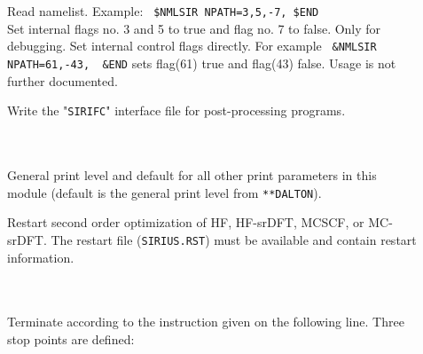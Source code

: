 \begin{description}

\item[] \ \\
   \\
  Read namelist. Example: \verb" $NMLSIR NPATH=3,5,-7, $END" \\
  Set internal flags no. 3 and 5 to true and flag no. 7 to false.
  Only for debugging. Set internal control flags directly.
  For example  \verb" &NMLSIR NPATH=61,-43,  &END" sets flag(61) true and flag(43) false.
  Usage is not further documented.

\item[]
  Write the "\verb|SIRIFC|" interface file for post-processing programs.


\item[] \ \\
   \\
  General {\sir} print level and default for all other print parameters in this module
  (default is the general print level from \verb|**DALTON|).

\item[]
  Restart {\sir} second order optimization of HF, HF-srDFT, MCSCF, or MC-srDFT.
  The {\sir} restart file (\verb|SIRIUS.RST|) must be available and contain restart information.


\item[] \ \\
   \\
  Terminate {\sir} according to the instruction given on the following line.
  Three stop points are defined:
\begin{enumerate}


\end{enumerate}
\end{description}
